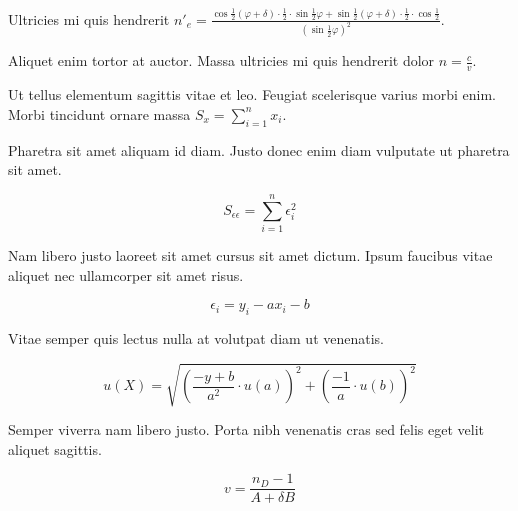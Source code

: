 \documentclass{article}
\begin{document}
Ultricies mi quis hendrerit \begin{math}
	n'_e=\frac{\cos \frac{1}{2}(\varphi +\delta)\cdot \frac{1}{2} \cdot \sin \frac{1}{2} \varphi + \sin \frac{1}{2}(\varphi +\delta)\cdot \frac{1}{2} \cdot \cos \frac{1}{2} }{(\sin \frac{1}{2}\varphi)^2}
\end{math}.\newline

Aliquet enim tortor at auctor. Massa ultricies mi quis hendrerit dolor $ n=\frac{c}{v} $.\newline

Ut tellus elementum sagittis vitae et leo. Feugiat scelerisque varius morbi enim. Morbi tincidunt ornare massa \( S_x=\sum_{i=1}^{n}x_i \).\newline

Pharetra sit amet aliquam id diam. Justo donec enim diam vulputate ut pharetra sit amet.

\[ S_{\epsilon \epsilon}=\sum_{i=1}^{n}\epsilon_i^2 \]

Nam libero justo laoreet sit amet cursus sit amet dictum. Ipsum faucibus vitae aliquet nec ullamcorper sit amet risus.

$$ \epsilon_i=y_i-ax_i-b $$

Vitae semper quis lectus nulla at volutpat diam ut venenatis.

\begin{displaymath}
	u(X)=\sqrt{(\frac{-y+b}{a^2}\cdot u(a))^2+(\frac{-1}{a}\cdot u(b))^2}
\end{displaymath}

Semper viverra nam libero justo. Porta nibh venenatis cras sed felis eget velit aliquet sagittis.

\begin{equation}
	v=\frac{n_D-1}{A+\delta B}
\end{equation}
\end{document}
